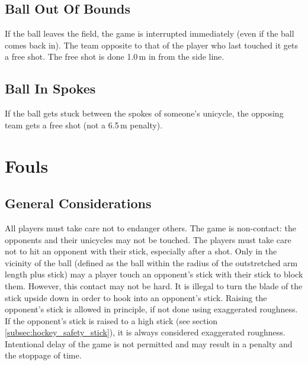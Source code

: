 \subsection{Ball Out Of Bounds}
If the ball leaves the field, the game is interrupted immediately (even if the ball comes back in).
The team opposite to that of the player who last touched it gets a free shot.
The free shot is done 1.0\,m in from the side line.

\subsection{Ball In Spokes}
If the ball gets stuck between the spokes of someone's unicycle, the opposing team gets a free shot (not a 6.5\,m penalty).

\section{Fouls}

\subsection{General Considerations}
All players must take care not to endanger others.
The game is non-contact: the opponents and their unicycles may not be touched.
The players must take care not to hit an opponent with their stick, especially after a shot.
Only in the vicinity of the ball (defined as the ball within the radius of the outstretched arm length plus stick) may a player touch an opponent's stick with their stick to block them.
However, this contact may not be hard.
It is illegal to turn the blade of the stick upside down in order to hook into an opponent's stick.
Raising the opponent's stick is allowed in principle, if not done using exaggerated roughness.
If the opponent's stick is raised to a high stick (see section \ref{subsec:hockey_safety_stick}), it is always considered exaggerated roughness.
Intentional delay of the game is not permitted and may result in a penalty and the stoppage of time.

